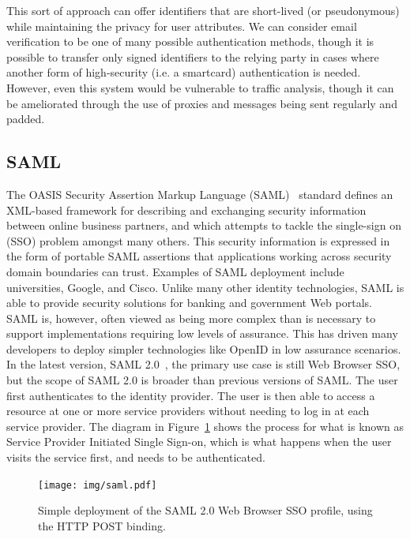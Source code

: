 This sort of approach can offer identifiers that are short-lived (or pseudonymous) while maintaining the privacy for user attributes. We can consider email verification to be one of many possible authentication methods, though it is possible to transfer only signed identifiers to the relying party in cases where another form of high-security (i.e. a smartcard) authentication is needed. However, even this system would be vulnerable to traffic analysis, though it can be ameliorated through the use of proxies  and messages being sent regularly and padded.


\subsection{SAML}
The OASIS Security Assertion Markup Language (SAML)~\cite{hallam2001security} standard defines an XML-based framework for describing and exchanging security information between online business partners, and which attempts to tackle the single-sign on (SSO) problem amongst many others. This security information is expressed in the form of portable SAML assertions that applications working across security domain boundaries can trust. Examples of SAML deployment include universities, Google, and Cisco. Unlike many other identity technologies, SAML is able to provide security solutions for banking and government Web portals. SAML is, however, often viewed as being more complex than is necessary to support implementations requiring low levels of assurance. This has driven many developers to deploy simpler technologies like OpenID in low assurance scenarios.\\

In the latest version, SAML 2.0~\cite{cantor2005saml}, the primary use case is still Web Browser SSO, but the scope of SAML 2.0 is broader than previous versions of SAML. The user first authenticates to the identity provider. The user is then able to access a resource at one or more service providers without needing to log in at each service provider. The diagram in Figure~\ref{fig:saml-flow} shows the process for what is known as Service Provider Initiated Single Sign-on, which is what happens when the user visits the service first, and needs to be authenticated.

\begin{figure}[htbp]
  \begin{center}
    \texttt{[image: img/saml.pdf]}
        \caption{Simple deployment of the SAML 2.0 Web Browser SSO profile, using the HTTP POST binding.}
        \label{fig:saml-flow}
  \end{center}
\end{figure}

